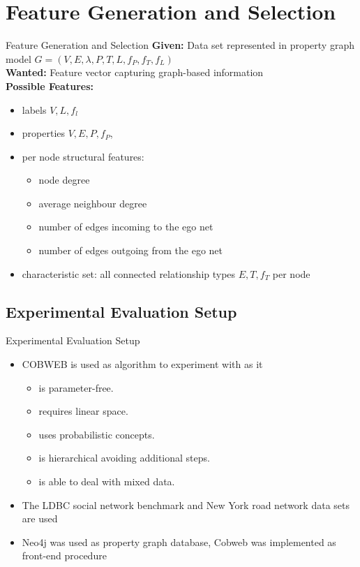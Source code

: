\documentclass[rgb]{beamer}
\begin{document}
\section{Feature Generation and Selection}
    \begin{frame}{Feature Generation and Selection}
        \textbf{Given:} Data set represented in property graph model  $G = (V, E, \lambda, P, T, L, f_P, f_T, f_L)$ \\
        \textbf{Wanted:} Feature vector capturing graph-based information \\
        \textbf{Possible Features:}
        \begin{itemize}
            \item labels $V, L, f_l$
            \item properties $V, E, P, f_P$,
            \item per node structural features:~\cite{henderson2011s, henderson2012rolx} 
            \begin{itemize}
                \item node degree
                \item average neighbour degree
                \item number of edges incoming to the ego net
                \item number of edges outgoing from the ego net
            \end{itemize}
            \item characteristic set: all connected relationship types $E, T, f_T$ per node~\cite{neumann2011characteristic}
        \end{itemize}
    \end{frame}
    
    \subsection{Experimental Evaluation Setup}
        \begin{frame}{Experimental Evaluation Setup}
        \begin{itemize}
            \item COBWEB is used as algorithm to experiment with as it
            \begin{itemize}
                \item is parameter-free.
                \item requires linear space.
                \item uses probabilistic concepts.
                \item is hierarchical avoiding additional steps.
                \item is able to deal with mixed data.
            \end{itemize}
            \item The LDBC social network benchmark and New York road network data sets are used
            \item Neo4j was used as property graph database, Cobweb was implemented as front-end procedure
        \end{itemize}
        \end{frame}
        
\end{document}
